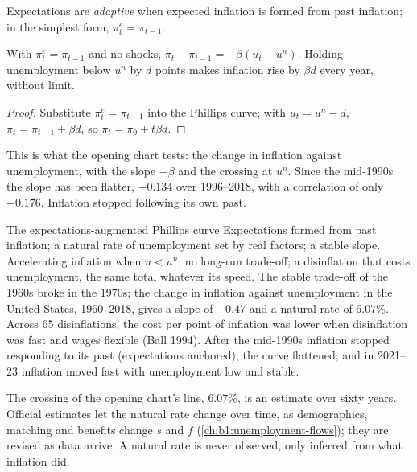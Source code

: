 \begin{definition}\label{def:b1:aggregate-supply:adaptive}
Expectations are \emph{adaptive} when expected inflation is formed from
past inflation; in the simplest form, $\pi^e_t = \pi_{t-1}$.
\end{definition}

\begin{proposition}\label{prop:b1:aggregate-supply:accelerate}
With $\pi^e_t = \pi_{t-1}$ and no shocks, $\pi_t - \pi_{t-1} = -\beta(u_t - u^n)$. Holding unemployment
below $u^n$ by $d$ points makes inflation rise by $\beta d$ every year, without limit.
\end{proposition}

\begin{proof}
Substitute $\pi^e_t = \pi_{t-1}$ into the Phillips curve; with $u_t = u^n - d$, $\pi_t = \pi_{t-1} + \beta d$, so
$\pi_t = \pi_0 + t\beta d$.
\end{proof}

This is what the opening chart tests: the change in inflation against
unemployment, with the slope $-\beta$ and the crossing at $u^n$. Since the mid-1990s
the slope has been flatter, $-0.134$ over 1996--2018, with a correlation of
only $-0.176$. %
Inflation stopped following its own past.

\begin{model}{The expectations-augmented Phillips curve}
\assumes Expectations formed from past inflation; a natural rate of
unemployment set by real factors; a stable slope.
\predicts Accelerating inflation when $u < u^n$; no long-run trade-off; a
disinflation that costs unemployment, the same total whatever its speed.
\tested The stable trade-off of the 1960s broke in the 1970s; the
change in inflation against unemployment in the United States,
1960--2018, gives a slope of $-0.47$ and a natural rate of $6.07\%$.
Across 65 disinflations, the cost per point of inflation was lower when
disinflation was fast and wages flexible (Ball 1994). %
\breaks After the mid-1990s inflation stopped responding to its past
(expectations anchored); the curve flattened; and in 2021--23 inflation
moved fast with unemployment low and stable.
\end{model}

\begin{measure}
The crossing of the opening chart's line, $6.07\%$, is an estimate over sixty
years. %
Official estimates let the natural rate change over time, as
demographics, matching and benefits change $s$ and $f$
(\cref{ch:b1:unemployment-flows}); they are revised as data arrive. A
natural rate is never observed, only inferred from what inflation did.
\end{measure}

